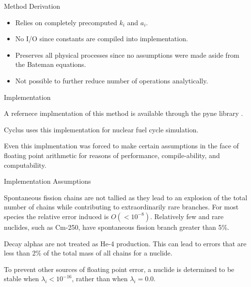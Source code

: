\documentclass[xcolor=x11names,compress]{beamer}
\begin{document}

\begin{frame}{Method Derivation}

    \begin{itemize}
        \item Relies on completely precomputed $k_i$ and $a_i$.
        \item No I/O since constants are compiled into implementation.
        \item Preserves all physical processes since no assumptions were made 
              aside from the Bateman equations.
        \item Not possible to further reduce number of operations analytically.
    \end{itemize}

\end{frame}


\begin{frame}{Implementation}

    A refernece implmentation of this method is available through the pyne 
    library \cite{pyne}.

    \vspace*{1em}
    Cyclus \cite{cyclus2015} uses this implementation for nuclear fuel cycle 
    simulation.

    \vspace*{1em}
    Even this implmentation was forced to make certain assumptions in the 
    face of floating point arithmetic for reasons of
    performance, compile-ability, and computability.

\end{frame}


\begin{frame}{Implementation Assumptions}

    Spontaneous fission chains are not tallied as they 
    lead to an explosion of the total number of chains while contributing to 
    extraordinarily rare branches. For most species the relative error
    induced is $O(<10^{-8})$.  Relatively few and rare nuclides, such as Cm-250, 
    have spontaneous fission branch greater than 5\%.

    \vspace*{1em}
    Decay alphas are not treated as He-4 production.  This can lead to 
    errors that are less than 2\% of the total mass of all chains for a
    nuclide.  

    \vspace*{1em}
    To prevent other sources of floating point error, a nuclide is 
    determined to be stable when $\lambda_i < 10^{-16}$, rather than when 
    $\lambda_i = 0.0$.


\end{frame}
\end{document}

